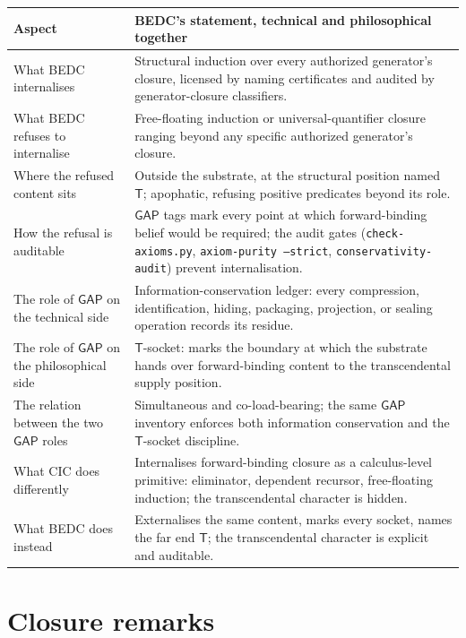 \begin{longtable}{p{}p{}}
\toprule
\textbf{Aspect} & \textbf{BEDC's statement, technical and philosophical together} \\
\midrule
What BEDC internalises & Structural induction over every authorized generator's closure, licensed by naming certificates and audited by generator-closure classifiers. \\
What BEDC refuses to internalise & Free-floating induction or universal-quantifier closure ranging beyond any specific authorized generator's closure. \\
Where the refused content sits & Outside the substrate, at the structural position named $\mathsf{T}$; apophatic, refusing positive predicates beyond its role. \\
How the refusal is auditable & $\mathsf{GAP}$ tags mark every point at which forward-binding belief would be required; the audit gates (\texttt{check-axioms.py}, \texttt{axiom-purity --strict}, \texttt{conservativity-audit}) prevent internalisation. \\
The role of $\mathsf{GAP}$ on the technical side & Information-conservation ledger: every compression, identification, hiding, packaging, projection, or sealing operation records its residue. \\
The role of $\mathsf{GAP}$ on the philosophical side & $\mathsf{T}$-socket: marks the boundary at which the substrate hands over forward-binding content to the transcendental supply position. \\
The relation between the two $\mathsf{GAP}$ roles & Simultaneous and co-load-bearing; the same $\mathsf{GAP}$ inventory enforces both information conservation and the $\mathsf{T}$-socket discipline. \\
What CIC does differently & Internalises forward-binding closure as a calculus-level primitive: eliminator, dependent recursor, free-floating induction; the transcendental character is hidden. \\
What BEDC does instead & Externalises the same content, marks every socket, names the far end $\mathsf{T}$; the transcendental character is explicit and auditable. \\
\bottomrule
\end{longtable}

\section{Closure remarks}
\label{sec:certificate-closure-closure-remarks}

